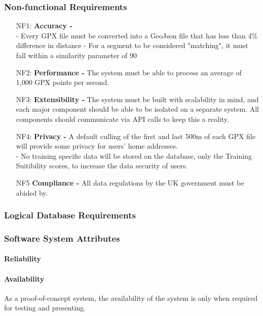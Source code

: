 \documentclass[11pt,a4paper]{report}
\begin{document}
\subsubsection{Non-functional Requirements}
\begin{enumerate}
	\item[NF1:] \textbf{Accuracy - } \\
	      - Every GPX file must be converted into a GeoJson file that has less than 4\% difference in distance
	      - For a segment to be considered "matching", it must fall within a similarity parameter of 90%
	\item[NF2:] \textbf{Performance - } The system must be able to process an average of 1,000 GPX points per second.
	\item[NF3:] \textbf{Extensibility - } The system must be built with scalability in mind, and each major component should be able to be isolated
	      on a separate system. All components should communicate via API calls to keep this a reality.
	\item[NF4:] \textbf{Privacy - } A default culling of the first and last 500m of each GPX file will provide some privacy for users' home addresses.\\
	      - No training specific data will be stored on the database, only the Training Suitibility scores, to increase the data security of
	      users.
	\item[NF5] \textbf{Compliance - } All data regulations by the UK government must be abided by.
\end{enumerate}


\subsubsection{Logical Database Requirements}

\subsubsection{Software System Attributes}
\paragraph{Reliability}

\paragraph{Availability}
As a proof-of-concept system, the availability of the system is only when required for testing and presenting.
\end{document}

